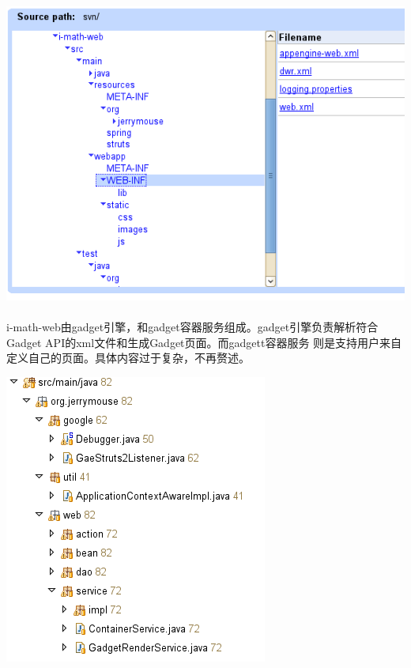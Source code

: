 \documentclass[12pt,a4paper,titlepage]{article}
\begin{document}
\includegraphics[width=\textwidth]{web.png}

\paragraph{}
i-math-web由gadget引擎，和gadget容器服务组成。gadget引擎负责解析符合Gadget API的xml文件和生成Gadget页面。而gadgett容器服务
则是支持用户来自定义自己的页面。具体内容过于复杂，不再赘述。

\includegraphics[width=\textwidth/2]{java.png}
\end{document}
